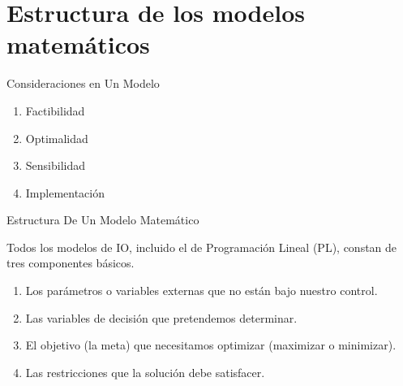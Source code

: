 \section{Estructura de los modelos matemáticos}
\label{sec:formulations}



\begin{frame}{Consideraciones en Un Modelo }
  \begin{enumerate} \justifying \parskip3mm
  \item Factibilidad
  \item Optimalidad
  \item Sensibilidad
  \item Implementación
  \end{enumerate}
\end{frame}



\begin{frame}{Estructura De Un Modelo Matemático}

Todos los modelos de IO, incluido el de Programación Lineal (PL), constan de tres componentes básicos.

  \begin{enumerate} \justifying 
  \item Los \alert{parámetros} o variables externas que no están bajo nuestro control.
  \item Las \alert{variables de decisión} que pretendemos determinar.
  \item El \alert{objetivo} (la meta) que necesitamos optimizar (maximizar o minimizar).
  \item Las \alert{restricciones} que la solución debe satisfacer.
  \end{enumerate}
   
\end{frame}




















